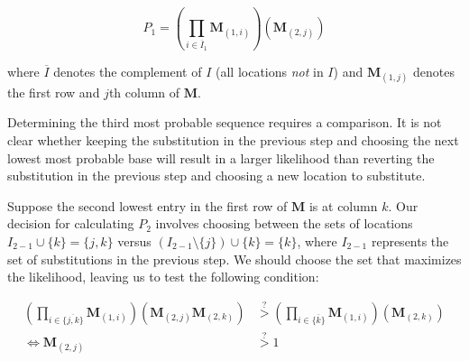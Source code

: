 \documentclass[
]{article}
\begin{document}
\[
P_1 = \left(\prod_{i\in \overline I_1}\mathbf M_{(1, i)}\right)\left(\mathbf M_{(2, j)}\right)
\]

\noindent where \(\overline I\) denotes the complement of \(I\) (all
locations \emph{not} in \(I\)) and \(\mathbf M_{(1, j)}\) denotes the
first row and \(j\)th column of \(\mathbf M\).

Determining the third most probable sequence requires a comparison. It
is not clear whether keeping the substitution in the previous step and
choosing the next lowest most probable base will result in a larger
likelihood than reverting the substitution in the previous step and
choosing a new location to substitute.

Suppose the second lowest entry in the first row of \(\mathbf M\) is at
column \(k\). Our decision for calculating \(P_2\) involves choosing
between the sets of locations \(I_{2-1}\cup \{k\} = \{j, k\}\) versus
\(\left(I_{2-1}\setminus\{j\}\right)\cup\{k\} = \{k\}\), where
\(I_{2-1}\) represents the set of substitutions in the previous step. We
should choose the set that maximizes the likelihood, leaving us to test
the following condition:

\begin{align}
\left(\prod_{i\in \overline {\{j,k\}}}\mathbf M_{(1, i)}\right)\left(\mathbf M_{(2, j)}\mathbf M_{(2, k)}\right) &\stackrel{?}{>} \left(\prod_{i\in \overline {\{k\}}}\mathbf M_{(1, i)}\right)\left(\mathbf M_{(2, k)}\right) \\
\Leftrightarrow \mathbf M_{(2, j)} &\stackrel{?}{>} 1
\end{align}

  
\end{document}

